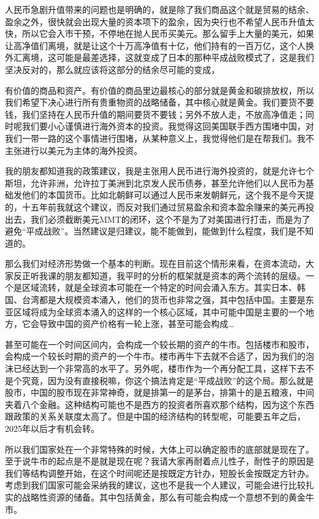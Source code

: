 \documentclass[UTF8, 12pt, a4paper]{ctexrep}
\begin{document}
人民币急剧升值带来的问题也是明确的，就是除了我们商品这个就是贸易的结余、盈余之外，很快就会出现大量的资本项下的盈余，因为央行也不希望人民币升值太快，所以它会入市干预，不停地在抛人民币买美元。那么留手上大量的美元，如果让高净值们离境，就是让这个十万高净值有十亿，他们持有的一百万亿，这个人换外汇离境，这可能是最差选择，这就变成了日本的那种平成战败模式了，这是我们坚决反对的，那么就应该将这部分的结余尽可能的变成，

有价值的商品和资产。有价值的商品里边最核心的部分就是黄金和碳排放权，所以我们希望下决心进行所有贵重物资的战略储备，其中核心就是黄金。我们要货不要钱，我们坚持在人民币升值的期间要货不要钱；另外不放人走，不放高净值走；同时呢我们要小心谨慎进行海外资本的投资。我觉得这回美国联手西方围堵中国，对我们一带一路的这个事情进行围堵，从某种意义上，我觉得他们是在帮我们。我不主张进行以美元为主体的海外投资。

我的朋友都知道我的政策建议，我是主张用人民币进行海外投资的，就是允许七个斯坦，允许非洲，允许拉丁美洲到北京发人民币债券，甚至允许他们以人民币为基础发他们的本国货币。比如北朝鲜可以通过人民币来发朝鲜元，这个我不是今天提的，十五年前我就这个建议，而反对我们通过贸易盈余和资本盈余赚来的美元再投出去，我们必须截断美元MMT的闭环，这个不是为了对美国进行打击，而是为了避免“平成战败”。当然建议是归建议，能不能做到，能做到什么程度，我们是不知道的。

那么我们对经济形势做一个基本的判断。现在目前这个情形来看，在资本流动，大家反正听我课的朋友都知道，我平时的分析的框架就是资本的两个流转的层级。一个是区域流转，就是全球资本可能在一个特定的时间会涌入东方。其实日本、韩国、台湾都是大规模资本涌入，他们的货币也非常之强，其中包括中国。主要是东亚区域将成为全球资本涌入的这样的一个核心区域，其中可能中国是主要的一个地方，它会导致中国的资产价格有一轮上涨，甚至可能会构成…

甚至可能在一个时间区间内，会构成一个较长期的资产的牛市。包括楼市和股市，会构成一个较长时期的资产的一个牛市。楼市再牛下去就不合适了，因为我们的泡沫已经达到一个非常高的水平了。另外呢，楼市作为一个再分配工具，这样下去不是个究竟，因为没有直接税嘛，你这个搞法肯定是“平成战败”的这个局。那么就是股市，中国的股市现在非常神奇，就是排第一的是茅台，排第十的是五粮液，中间夹着八个金融。这种结构可能也不是西方的投资者所喜欢那个结构，因为这个东西跟政策的关系关联度太高了。但是中国的经济结构的转型呢，可能要五年之后，2025年以后才有机会转。

所以我们国家处在一个非常特殊的时候，大体上可以确定股市的底部就是现在了。至于说牛市的起点是不是就是现在呢？我请大家再耐着点儿性子，耐性子的原因是我们等结构调整开始，在这个时间呢还是按既定方针办，短股长金按既定方针办。考虑到我们国家可能会采纳我的建议，这也不是我一个人建议，可能会进行比较扎实的战略性资源的储备。其中包括黄金，那么有可能会构成一个意想不到的黄金牛市。
\end{document}

